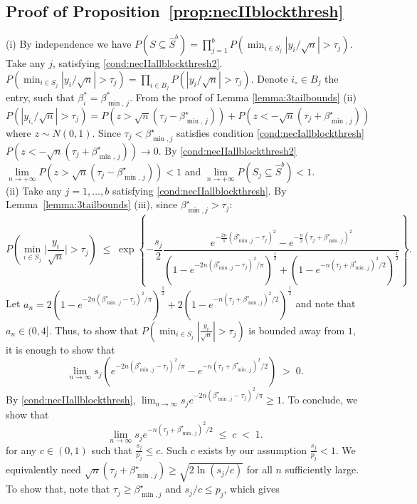 \documentclass[aos]{imsart}
\theoremstyle{plain}
\begin{document}
\subsection{Proof of Proposition~\ref{prop:necIIblockthresh}} 
(i) By independence we have 
$P(S \subseteq \hat{S}^{b})=\prod_{j=1}^b P(\min_{i \in S_j}|y_i/\sqrt{n}| > \tau_j)$. Take any $j$, satisfying \eqref{cond:necIIallblockthresh2}. $P(\min_{i \in S_j}|y_i/\sqrt{n}| > \tau_j)=\prod_{i \in B_j} P(|y_i/\sqrt{n}| > \tau_j)$. Denote $i_{\circ}\in B_j$ the entry, such that $\beta_i^*=\beta^*_{\min,\,j}$. From the proof of Lemma \ref{lemma:3tailbounds} (ii) $$P(|y_{i_{\circ}}/\sqrt{n}|>\tau_j) 
    = P\left(z>\sqrt{n}\left(\tau_j-\beta_{\min,\,j}^{\star}\right)\right) + P\left(z<-\sqrt{n}\left(\tau_j+\beta_{\min,\,j}^{\star}\right)\right)$$ where $z\sim N(0,1)$. Since $\tau_j<\beta^\star_{\min,j}$ satisfies condition \eqref{cond:necIallblockthresh} $P(z<-\sqrt{n}\left(\tau_j+\beta_{\min,\,j}^{\star}\right)) \to 0$. By \eqref{cond:necIIallblockthresh2} $\underset{n \to +\infty}{\lim}P\left(z>\sqrt{n}\left(\tau_j-\beta_{\min,\,j}^{\star}\right)\right)<1$ and $\underset{n \to +\infty}{\lim}P\left(S_j \subseteq \hat{S}^{b} \right)<1$.\\
(ii)	Take any $j=1,\ldots,b$ satisfying \eqref{cond:necIIallblockthresh}. By Lemma~\ref{lemma:3tailbounds} (iii), since $\beta^\star_{\min,j}>\tau_j$:
$$P\left(\min_{i \in S_j}\Big|\frac{y_i}{\sqrt{n}}\Big| > \tau_j \right)\;\leq\;\exp\left\{-\frac{s_j}{2}\frac{e^{-\tfrac{2n}{\pi}(\beta^\star_{\min,j}-\tau_j)^2}-e^{-\tfrac{n}{2}(\tau_j+\beta^\star_{\min,j})^2}}{\left(1-e^{-2n(\beta^\star_{\min,j}-\tau_j)^2/\pi}\right)^{\frac{1}{2}}+\left(1-e^{-n(\tau_j+\beta^\star_{\min,j})^2/2}\right)^{\frac{1}{2}}}\right\}. $$
Let $a_{n}=2\left(1-e^{-2n(\beta^\star_{\min,j}-\tau_j)^2/\pi}\right)^{\frac{1}{2}}+2\left(1-e^{-n(\tau_j+\beta^\star_{\min,j})^2/2}\right)^{\frac{1}{2}}$ and note that $a_n\in (0, 4]$.  Thus, to show that $P\left(\min_{i \in S_j}|\tfrac{y_i}{\sqrt{n}}| > \tau_j \right)$ is bounded away from $1$, it is enough to show that 
$$
\lim_{n\to \infty}{s_j}({e^{-2n(\beta^\star_{\min,j}-\tau_j)^2/\pi}-e^{-n(\tau_j+\beta^\star_{\min,j})^2/2}})\;>\;0.
$$
By \eqref{cond:necIIallblockthresh}, $\lim_{n\to\infty} {s_j} e^{-2n(\beta^\star_{\min,j}-\tau_j)^2/\pi}\geq 1$. To conclude, we show that
$$
\lim_{n\to\infty} {s_j} e^{-n(\tau_j+\beta^\star_{\min,j})^2/2}\;\leq\;c\;<\;1.
$$ 
for any $c\in(0,1)$ such that $\tfrac{s_j}{p_j}\leq c$. Such $c$ exists by our assumption $\tfrac{s_j}{p_j}<1$.
We equivalently need
$\sqrt{n}(\tau_j+\beta^\star_{\min,j})\geq\sqrt{{2\ln (s_j/c)}}$ for all $n$ sufficiently large. To show that, note that $\tau_j\geq \beta^\star_{\min,j}$ and $s_j/c\leq p_j$, which gives
\end{document}
